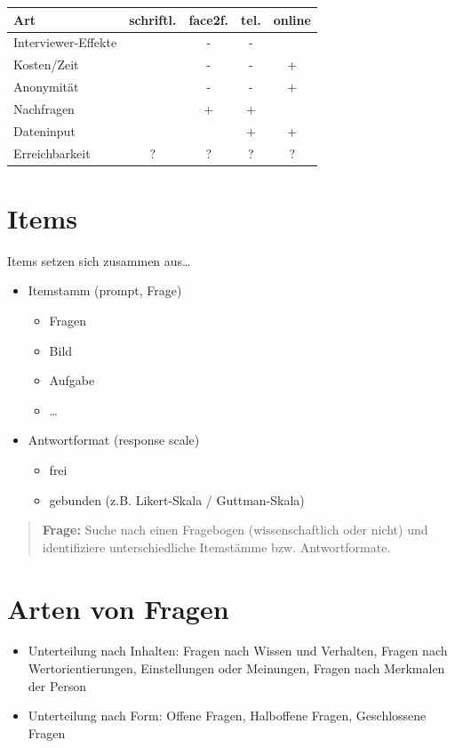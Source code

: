 \documentclass[
]{book}
\providecommand{\tightlist}{%
  \setlength{\itemsep}{0pt}\setlength{\parskip}{0pt}}
\begin{document}
\begin{longtable}[]{@{}lcccc@{}}
\toprule
Art & schriftl. & face2f. & tel. & online\tabularnewline
\midrule
\endhead
Interviewer-Effekte & & - & - &\tabularnewline
Kosten/Zeit & & - & - & +\tabularnewline
Anonymität & & - & - & +\tabularnewline
Nachfragen & & + & + &\tabularnewline
Dateninput & & & + & +\tabularnewline
Erreichbarkeit & ? & ? & ? & ?\tabularnewline
\bottomrule
\end{longtable}

\hypertarget{items}{%
\section{Items}\label{items}}

Items setzen sich zusammen aus\ldots{}

\begin{itemize}
\tightlist
\item
  Itemstamm (prompt, Frage)

  \begin{itemize}
  \tightlist
  \item
    Fragen
  \item
    Bild
  \item
    Aufgabe
  \item
    \ldots{}
  \end{itemize}
\item
  Antwortformat (response scale)

  \begin{itemize}
  \tightlist
  \item
    frei
  \item
    gebunden (z.B. Likert-Skala / Guttman-Skala)
  \end{itemize}
\end{itemize}

\begin{quote}
\textbf{Frage:} Suche nach einen Fragebogen (wissenschaftlich oder nicht) und identifiziere unterschiedliche Itemstämme bzw. Antwortformate.
\end{quote}

\hypertarget{arten-von-fragen}{%
\section{Arten von Fragen}\label{arten-von-fragen}}

\begin{itemize}
\tightlist
\item
  Unterteilung nach Inhalten: Fragen nach Wissen und Verhalten, Fragen nach Wertorientierungen, Einstellungen oder Meinungen, Fragen nach Merkmalen der Person
\item
  Unterteilung nach Form: Offene Fragen, Halboffene Fragen, Geschlossene Fragen
\end{itemize}
\end{document}
